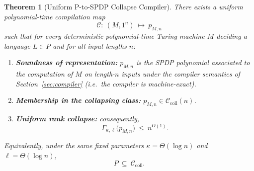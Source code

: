 \documentclass[12pt]{article}
\newcommand{\Comp}{\mathcal{C}}
\newtheorem{theorem}{Theorem}
\theoremstyle{definition}
\theoremstyle{definition}
\theoremstyle{remark}
\theoremstyle{remark}
\begin{document}
\begin{theorem}[Uniform P-to-SPDP Collapse Compiler]
\label{thm:uniform-p-to-spdp}
There exists a \emph{uniform} polynomial-time compilation map
\[
\Comp:\ (M,1^n)\ \mapsto\ p_{M,n}
\]
such that for every deterministic polynomial-time Turing machine $M$ deciding a
language $L\in P$ and for all input lengths $n$:

\begin{enumerate}[label=(\roman*)]
\item \textbf{Soundness of representation:} $p_{M,n}$ is the SPDP polynomial
associated to the computation of $M$ on length-$n$ inputs under the compiler
semantics of Section~\ref{sec:compiler} (i.e.\ the compiler is machine-exact).

\item \textbf{Membership in the collapsing class:} $p_{M,n}\in
\mathcal{C}_{\mathrm{coll}}(n)$.

\item \textbf{Uniform rank collapse:} consequently,
\[
\Gamma_{\kappa,\ell}\!\bigl(p_{M,n}\bigr)\ \le\ n^{O(1)}.
\]
\end{enumerate}

Equivalently, under the same fixed parameters $\kappa=\Theta(\log n)$ and
$\ell=\Theta(\log n)$,
\[
P\ \subseteq\ \mathcal{C}_{\mathrm{coll}}.
\]
\end{theorem}
\end{document}
